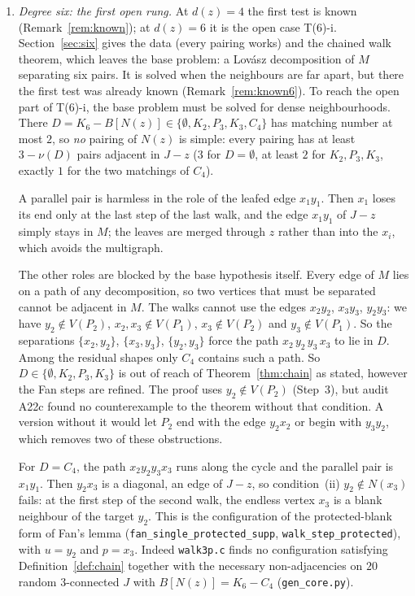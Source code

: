 \documentclass[11pt]{amsart}
\theoremstyle{definition}
\begin{document}
\begin{enumerate}
\item \emph{Degree six: the first open rung.} At $d(z)=4$ the first test is known
(Remark~\ref{rem:known}); at $d(z)=6$ it is the open case T(6)-i. Section~\ref{sec:six} gives the
data (every pairing works) and the chained walk theorem, which leaves the base problem: a
Lov\'asz decomposition of $M$ separating six pairs. It is solved when the neighbours are far
apart, but there the first test was already known (Remark~\ref{rem:known6}). To reach the open
part of T(6)-i, the base problem must be solved for dense neighbourhoods. There
$D=K_6-B[N(z)]\in\{\emptyset,K_2,P_3,K_3,C_4\}$ has matching number at most $2$, so \emph{no}
pairing of $N(z)$ is simple: every pairing has at least $3-\nu(D)$ pairs adjacent in $J-z$ ($3$ for
$D=\emptyset$, at least $2$ for $K_2,P_3,K_3$, exactly $1$ for the two matchings of $C_4$).

A parallel pair is harmless in the role of the leafed edge $x_1y_1$. Then $x_1$ loses its end
only at the last step of the last walk, and the edge $x_1y_1$ of $J-z$ simply stays in $M$; the
leaves are merged through $z$ rather than into the $x_i$, which avoids the multigraph.

The other roles are blocked by the base hypothesis itself. Every edge of $M$ lies on a path of
any decomposition, so two vertices that must be separated cannot be adjacent in $M$. The walks
cannot use the edges $x_2y_2$, $x_3y_3$, $y_2y_3$: we have $y_2\notin V(P_2)$, $x_2,x_3\notin V(P_1)$,
$x_3\notin V(P_2)$ and $y_3\notin V(P_1)$. So the separations $\{x_2,y_2\}$, $\{x_3,y_3\}$,
$\{y_2,y_3\}$ force the path $x_2\,y_2\,y_3\,x_3$ to lie in $D$. Among the residual shapes only
$C_4$ contains such a path. So $D\in\{\emptyset,K_2,P_3,K_3\}$ is out of reach of
Theorem~\ref{thm:chain} as stated, however the Fan steps are refined. The proof uses
$y_2\notin V(P_2)$ (Step~3), but audit A22c found no counterexample to the theorem without that
condition. A version without it would let $P_2$ end with the edge $y_2x_2$ or begin with $y_3y_2$,
which removes two of these obstructions.

For $D=C_4$, the path $x_2y_2y_3x_3$ runs along the cycle and the parallel pair is $x_1y_1$. Then
$y_2x_3$ is a diagonal, an edge of $J-z$, so condition~(ii) $y_2\notin N(x_3)$ fails: at the first
step of the second walk, the endless vertex $x_3$ is a blank neighbour of the target $y_2$. This is
the configuration of the protected-blank form of Fan's lemma (\texttt{fan\_single\_protected\_supp},
\texttt{walk\_step\_protected}), with $u=y_2$ and $p=x_3$. Indeed \texttt{walk3p.c} finds no
configuration satisfying Definition~\ref{def:chain} together with the necessary non-adjacencies
on $20$ random $3$-connected $J$ with $B[N(z)]=K_6-C_4$ (\texttt{gen\_core.py}).


\end{enumerate}
\end{document}
